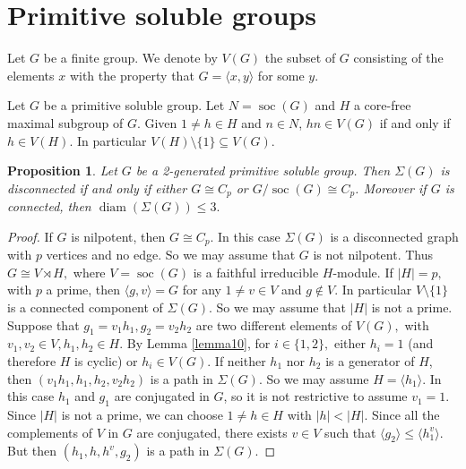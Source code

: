 \documentclass{amsart}
\DeclareMathOperator{\soc}{soc}
\DeclareMathOperator{\diam}{diam}
\newtheorem{prop}[thm]{Proposition} \newtheorem{rem}[thm]{Remark}
\numberwithin{equation}{section}
\begin{document}
\section{Primitive soluble groups}\label{prsogr}

\begin{defn} Let $G$ be a finite group. We denote by $V(G)$ the subset of $G$ consisting of the elements $x$ with the property that $G=\langle x, y\rangle$ for some $y.$
\end{defn}

\begin{lemma}\cite[Proposition 2.2]{nof}\label{lemma10}
	Let $G$ be  a primitive  soluble group. Let $N=\soc(G)$ and $H$ a core-free maximal subgroup of $G$. Given $1\neq  h\in H$ and $n\in N$, $hn \in V(G)$ if and only if $h\in V(H).$ In particular $V(H)\setminus \{1\}\subseteq V(G).$
\end{lemma}



\begin{prop}\label{monosol}
Let $G$ be a 2-generated primitive soluble group. Then $\Sigma(G)$ is disconnected  if and only if either $G\cong C_p$ or $G/\soc(G)\cong C_p$. Moreover if $G$ is connected, then $\diam(\Sigma(G))\leq 3.$
\end{prop}
\begin{proof}
	If $G$ is nilpotent, then $G\cong C_p.$ In this case $\Sigma(G)$ is a disconnected graph with $p$ vertices and no edge. So we may assume that $G$ is not nilpotent. Thus $G\cong V \rtimes H,$ where $V=\soc(G)$ is a faithful irreducible $H$-module.  If $|H|=p,$ with $p$ a prime, then $\langle g, v \rangle=G$ for any $1\neq v \in V$ and $g\notin V.$ In particular $V\setminus \{1\}$ is a connected component of $\Sigma(G)$. So we may assume that $|H|$ is not a prime.
		Suppose that $g_1=v_1h_1, g_2=v_2h_2$ are two different elements of $V(G),$ with $v_1, v_2 \in V, h_1, h_2 \in H.$  By Lemma \ref{lemma10}, for $i\in \{1,2\},$ either $h_i=1$ (and therefore $H$ is cyclic) or $h_i \in V(G).$
	 If neither $h_1$ nor $h_2$ is a generator of $H$, then $(v_1h_1,h_1,h_2,v_2h_2)$ is a path in $\Sigma(G)$. So we may assume $H=\langle h_1 \rangle.$ In this case $h_1$ and $g_1$ are conjugated in $G$, so it is not restrictive to assume $v_1=1.$ %
	Since $|H|$ is not a prime, we can choose  $1\neq h \in H$ with $|h|<|H|.$ Since all the complements of $V$ in $G$ are conjugated, there exists $v\in V$ such that 
	$\langle g_2 \rangle \leq \langle h_1^v\rangle.$
But then $(h_1,h,h^v,g_2)$  is a path in $\Sigma(G).$ 
	\end{proof}
\end{document}
